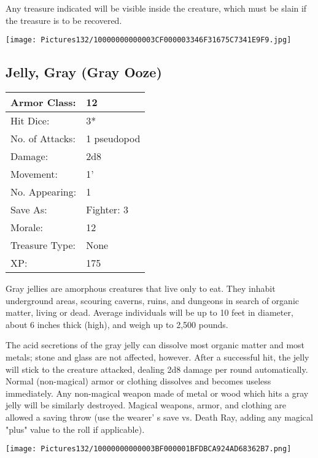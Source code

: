 \documentclass[a4paper,twoside,openany,10pt]{book}
\begin{document}
\begin{multicols}{2}
Any treasure indicated will be visible inside the creature, which must be slain if the treasure is to be recovered.

\begin{center} \texttt{[image: Pictures132/10000000000003CF000003346F31675C7341E9F9.jpg]} \end{center}


\subsection*{Jelly, Gray (Gray Ooze)}\label{jelly-gray-gray-ooze}

\begin{tabularx}{0.50\textwidth}{@{}lX@{}}
Armor Class: & 12 \\\hline
Hit Dice: & 3*  \\\hline
No. of Attacks: & 1 pseudopod \\\hline
Damage: & 2d8 \\\hline
Movement: & 1' \\\hline
No. Appearing: & 1 \\\hline
Save As: & Fighter: 3 \\\hline
Morale: & 12 \\\hline
Treasure Type: & None \\\hline
XP: & 175 \\\hline
\end{tabularx}\medskip

Gray jellies are amorphous creatures that live only to eat. They inhabit underground areas, scouring caverns, ruins, and dungeons in search of organic matter, living or dead. Average individuals will be up to 10 feet in diameter, about 6 inches thick (high), and weigh up to 2,500 pounds.

The acid secretions of the gray jelly can dissolve most organic matter and most metals; stone and glass are not affected, however. After a successful hit, the jelly will stick to the creature attacked, dealing 2d8 damage per round automatically. Normal (non-magical) armor or clothing dissolves and becomes useless immediately. Any non-magical weapon made of metal or wood which hits a gray jelly will be similarly destroyed. Magical weapons, armor, and clothing are allowed a saving throw (use the wearer' s save vs. Death Ray, adding any magical "plus" value to the roll if applicable).

\begin{center} \texttt{[image: Pictures132/10000000000003BF000001BFDBCA924AD68362B7.png]} \end{center}



\end{multicols}
\end{document}
